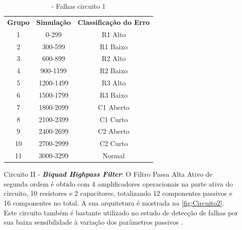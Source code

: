 \begin{enumerate}
 \begin{table}[H]
         \centering
        \begin{tabular}{ccc}
        \textbf{Grupo} & \textbf{Simulação} & \textbf{Classificação do Erro} \\
   1              & 0-299              & R1 Alto                        \\
        2              & 300-599            & R1 Baixo                       \\
        3              & 600-899            & R2 Alto                        \\
        4              & 900-1199           & R2 Baixo                       \\
        5              & 1200-1499          & R3 Alto                        \\
        6              & 1500-1799          & R3 Baixo                       \\
        7              & 1800-2099          & C1 Aberto                      \\
        8              & 2100-2399          & C1 Curto                       \\
        9              & 2400-2699          & C2 Aberto                      \\
        10             & 2700-2999          & C2 Curto                       \\
        11             & 3000-3299          & Normal                     \end{tabular}
        \caption{\label{tab:falhasckt1}- Falhas circuito 1}
\end{table}  


    

 \item[Circuito II - ]    \textbf{\textit{Biquad Highpass Filter}}: O Filtro Passa Alta Ativo de segunda ordem é obtido com 4 amplificadores operacionais na parte ativa do circuito, 10 resistores e 2 capacitores, totalizando 12 componentes passivos e 16 componentes no total. A sua arquitetura é mostrada na \ref{fig:Circuito2}. Este circuito também é bastante utilizado no estudo de detecção de falhas por sua baixa sensibilidade à variação dos parâmetros passivos \cite{lombardi} . 
 


\end{enumerate}
